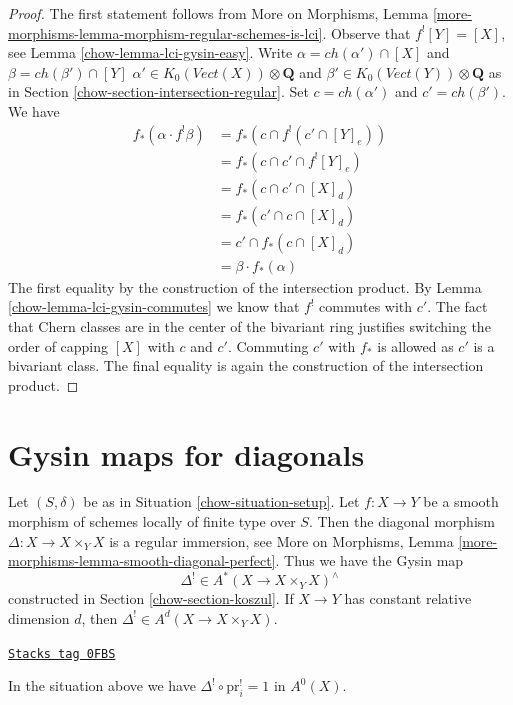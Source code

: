 \begin{proof}

The first statement follows from
More on Morphisms, Lemma
\ref{more-morphisms-lemma-morphism-regular-schemes-is-lci}.
Observe that $f^![Y] = [X]$, see Lemma \ref{chow-lemma-lci-gysin-easy}.
Write $\alpha = ch(\alpha') \cap [X]$ and $\beta = ch(\beta') \cap [Y]$
$\alpha' \in K_0(\textit{Vect}(X)) \otimes \mathbf{Q}$ and
$\beta' \in K_0(\textit{Vect}(Y)) \otimes \mathbf{Q}$
as in Section \ref{chow-section-intersection-regular}.
Set $c = ch(\alpha')$ and $c' = ch(\beta')$. We have
\begin{align*}
f_*(\alpha \cdot f^!\beta)
& =
f_*(c \cap f^!(c' \cap [Y]_e)) \\
& =
f_*(c \cap c' \cap f^![Y]_e) \\
& =
f_*(c \cap c' \cap [X]_d) \\
& =
f_*(c' \cap c \cap [X]_d) \\
& =
c' \cap f_*(c \cap [X]_d) \\
& =
\beta \cdot f_*(\alpha)
\end{align*}
The first equality by the construction of the intersection product.
By Lemma \ref{chow-lemma-lci-gysin-commutes} we know that $f^!$
commutes with $c'$. The fact that Chern classes are in the center
of the bivariant ring justifies switching the order of capping
$[X]$ with $c$ and $c'$. Commuting $c'$ with $f_*$ is allowed as $c'$
is a bivariant class. The final equality is again the construction
of the intersection product.
\end{proof}

\section{Gysin maps for diagonals}
\label{chow-section-gysin-for-diagonal}
Let $(S, \delta)$ be as in Situation \ref{chow-situation-setup}. Let $f : X \to Y$
be a smooth morphism of schemes locally of finite type over $S$. Then the
diagonal morphism $\Delta : X \longrightarrow X \times_Y X$
is a regular immersion, see
More on Morphisms, Lemma \ref{more-morphisms-lemma-smooth-diagonal-perfect}.
Thus we have the Gysin map
$$
\Delta^! \in A^*(X \to X \times_Y X)^\wedge
$$
constructed in Section \ref{chow-section-koszul}. If $X \to Y$ has constant
relative dimension $d$, then $\Delta^! \in A^d(X \to X \times_Y X)$.

\begin{lemma}
\label{chow-lemma-diagonal-identity}
\href{https://stacks.math.columbia.edu/tag/0FBS}{\texttt{Stacks tag 0FBS}}

In the situation above we have $\Delta^! \circ \text{pr}_i^! = 1$ in $A^0(X)$.
\end{lemma}

